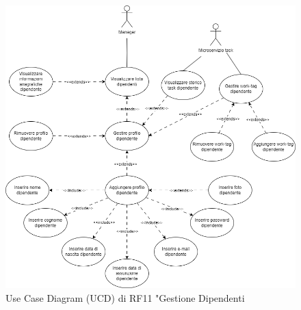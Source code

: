 \documentclass{report}
\begin{document}
\begin{figure}[H]
	\centering\includegraphics[width=1\textwidth]{images/UCD/RF11_gestionedipendenti_UCD.png}
	Use Case Diagram (UCD) di RF11 "Gestione Dipendenti
\end{figure}
\end{document}
